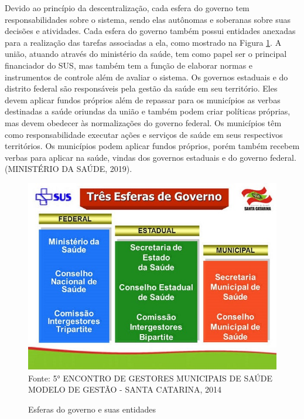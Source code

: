 \documentclass[
	12pt,				%
	openright,			%
	oneside,			%
	a4paper,			%
	chapter=TITLE,		%
	section=TITLE,		%
	subsection=TITLE,	%
	subsubsection=TITLE,%
	english,			%
	brazil				%
	]{abntex2}
\theoremstyle{definition}
\begin{document}
    Devido ao princípio da descentralização, cada esfera do governo tem responsabilidades sobre o sistema, sendo elas autônomas e soberanas sobre suas decisões e atividades. Cada esfera do governo também possui entidades anexadas para a realização das tarefas associadas a ela, como mostrado na Figura \ref{Esferas do governo e suas entidades}. A união, atuando através do ministério da saúde, tem como papel ser o principal financiador do SUS, mas também tem a função de elaborar normas e instrumentos de controle além de avaliar o sistema. Os governos estaduais e do distrito federal são responsáveis pela gestão da saúde em seu território. Eles devem aplicar fundos próprios além de repassar para os municípios as verbas destinadas a saúde oriundas da união e também podem criar políticas próprias, mas devem obedecer às normalizações do governo federal. Os municípios têm como responsabilidade executar ações e serviços de saúde em seus respectivos territórios. Os municípios podem aplicar fundos próprios, porém também recebem verbas para aplicar na saúde, vindas dos governos estaduais e do governo federal. (MINISTÉRIO DA SAÚDE, 2019).
    
    \begin{figure}[H]
         \centering
         \caption{Esferas do governo e suas entidades}
         \includegraphics[scale=1]{imagens/esferas-entidades.jpg}
         \\{\footnotesize Fonte: 5° ENCONTRO DE GESTORES MUNICIPAIS DE SAÚDE MODELO DE GESTÃO - SANTA CATARINA, 2014}
         \label{Esferas do governo e suas entidades}
    \end{figure}
    
\end{document}
